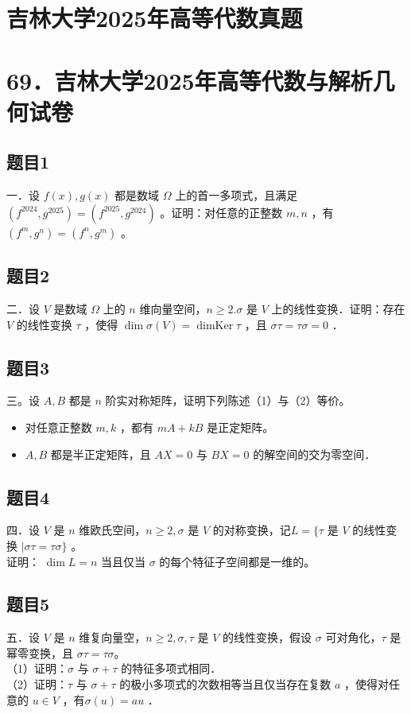 \documentclass{article}
\begin{document}
\section*{吉林大学2025年高等代数真题}
\section*{69．吉林大学2025年高等代数与解析几何试卷}

\subsection{题目1}
一．设 \(f(x), g(x)\) 都是数域 \(\Omega\) 上的首一多项式，且满足 \(\left(f^{2024}, g^{2025}\right)=\left(f^{2025}, g^{2024}\right)\) 。证明：对任意的正整数 \(m, n\) ，有 \(\left(f^{m}, g^{n}\right)=\left(f^{n}, g^{m}\right)\) 。

\subsection{题目2}
二．设 \(V\) 是数域 \(\Omega\) 上的 \(n\) 维向量空间，\(n \geq 2 . \sigma\) 是 \(V\) 上的线性变换．证明：存在 \(V\) 的线性变换 \(\tau\) ，使得 \(\operatorname{dim} \sigma(V)=\operatorname{dimKer} \tau\) ，且 \(\sigma \tau=\tau \sigma=0\) ．

\subsection{题目3}
三。设 \(A, B\) 都是 \(n\) 阶实对称矩阵，证明下列陈述（1）与（2）等价。

\begin{itemize}
  \item[（1）] 对任意正整数 \(m, k\) ，都有 \(m A+k B\) 是正定矩阵。
  \item[（2）] \(A, B\) 都是半正定矩阵，且 \(A X=0\) 与 \(B X=0\) 的解空间的交为零空间．
\end{itemize}

\subsection{题目4}
四．设 \(V\) 是 \(n\) 维欧氏空间，\(n \geq 2, \sigma\) 是 \(V\) 的对称变换，记\(L=\{\tau\) 是 \(V\) 的线性变换 \(\mid \sigma \tau=\tau \sigma\}\) 。\\
证明： \(\operatorname{dim} L=n\) 当且仅当 \(\sigma\) 的每个特征子空间都是一维的。

\subsection{题目5}
五．设 \(V\) 是 \(n\) 维复向量空，\(n \geq 2, \sigma, \tau\) 是 \(V\) 的线性变换，假设 \(\sigma\) 可对角化，\(\tau\) 是幂零变换，且 \(\sigma \tau=\tau \sigma\)。\\
（1）证明：\(\sigma\) 与 \(\sigma+\tau\) 的特征多项式相同．\\
（2）证明：\(\tau\) 与 \(\sigma+\tau\) 的极小多项式的次数相等当且仅当存在复数 \(a\) ，使得对任意的 \(u \in V\) ，有\(\sigma(u)=a u\) ．
\end{document}
